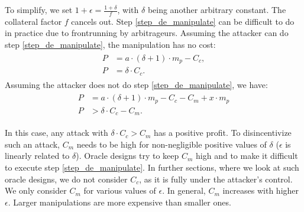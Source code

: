 \documentclass[conference]{IEEEtran}
\begin{document}
To simplify, we set $1+\epsilon = \frac{1 + \delta}{f}$, with $\delta$ being another arbitrary constant. The collateral factor $f$ cancels out. Step \ref{step_de_manipulate} can be difficult to do in practice due to frontrunning by arbitrageurs.
Assuming the attacker can do step \ref{step_de_manipulate}, the manipulation has no cost:
\begin{align*}
\begin{split}
    P &= a\cdot(\delta+1)\cdot m_p - C_c, \\
    P &= \delta\cdot C_c.
\end{split}
\end{align*}
Assuming the attacker does not do step \ref{step_de_manipulate}, we have:
\begin{align*}
\begin{split}
    P &= a\cdot(\delta+1)\cdot m_p - C_c - C_m + x \cdot m_p\\
    P &> \delta\cdot C_c - C_m.
\end{split}
\end{align*}

In this case, any attack with $\delta \cdot C_c > C_m$ has a positive profit. To disincentivize such an attack, $C_m$ needs to be high for non-negligible positive values of $\delta$ ($\epsilon$ is linearly related to $\delta$). Oracle designs try to keep $C_m$ high and to make it difficult to execute step \ref{step_de_manipulate}. In further sections, where we look at such oracle designs, we do not consider $C_c$, as it is fully under the attacker's control. We only consider $C_m$ for various values of $\epsilon$. In general, $C_m$ increases with higher $\epsilon$. Larger manipulations are more expensive than smaller ones.
\end{document}
